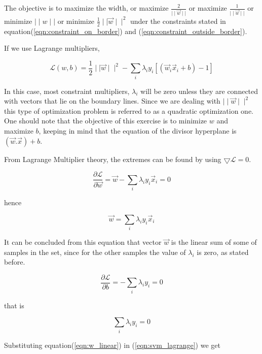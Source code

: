 \documentclass[]{article}
\begin{document}
The objective is to maximize the width, or maximize $\frac{2}{\mid\mid \vec{w} \mid\mid}$ or maximize $\frac{1}{\mid\mid \vec{w} \mid\mid}$ or minimize $\mid\mid w \mid\mid$ or minimize $ \frac{1}{2} \mid\mid \vec{w} \mid\mid^2$ under the constraints stated in equation(\ref{eqn:constraint_on_border}) and (\ref{eqn:constraint_outside_border}).


If we use Lagrange multipliers,


\begin{equation}
\label{eqn:svm_lagrange}
\mathcal{L}(w,b) = \frac{1}{2} \mid\mid \vec{w} \mid\mid^2 - \sum_{i} \lambda_{i}  y_i \left[ (\vec{w}_i \vec{x}_i +b ) -1 \right] 
\end{equation}

In this case, most constraint multipliers, $\lambda_{i}$ will be zero unless they are connected with vectors that lie on the boundary lines. Since we are dealing with $\mid\mid \vec{w} \mid\mid^2$ this type of optimization problem is referred to as a quadratic optimization one. One should note that the objective of this exercise is to minimize $w$ and maximize $b$, keeping in mind that the equation of the divisor hyperplane is $(\vec{w}.\vec{x})+b$.


\bigskip

From Lagrange Multiplier theory, the extremes can be found by using $\bigtriangledown \mathcal{L} =0$. 


\[
\frac{\partial \mathcal{L}}{\partial \vec{w}} = \vec{w} - \sum_{i} \lambda_{i} y_{i} \vec{x}_{i} = 0
\]

hence

\begin{equation}
\label{eqn:w_linear}
\vec{w} = \sum_{i} \lambda_{i} y_{i} \vec{x}_{i}
\end{equation}

It can be concluded from this equation that vector $\vec{w}$  is the linear sum of some of samples in the set, since for the other samples the value of $\lambda_{i}$ is zero, as stated before.


\[
\frac{\partial \mathcal{L}}{\partial b} = - \sum_{i} \lambda_{i} y_{i}  = 0
\]

that is

\begin{equation}
\label{eqn:lambda_y_0}
\sum_{i} \lambda_{i} y_{i}  = 0
\end{equation}

Substituting equation(\ref{eqn:w_linear}) in (\ref{eqn:svm_lagrange}) we get
\end{document}
